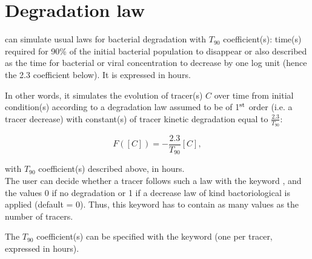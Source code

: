 \chapter{Degradation law}


\waqtel can simulate usual laws for bacterial degradation with
$T_{90}$ coefficient(s):
time(s) required for 90\% of the initial bacterial population to disappear
or also described as the time for bacterial or viral concentration to decrease
by one log unit (hence the 2.3 coefficient below).
It is expressed in hours.

In other words, it simulates the evolution of tracer(s) $C$ over time from
initial condition(s) according to a degradation law assumed to be of
1$^{\rm{st}}$ order (i.e. a tracer decrease) with constant(s) of tracer kinetic
degradation equal to $\frac{2.3}{T_{90}}$:

\begin{equation}
  F([C]) = -\frac{2.3}{T_{90}} [C],
\end{equation}

with $T_{90}$ coefficient(s) described above, in hours.
\\

The user can decide whether a tracer follows such a law
with the keyword ,
and the values 0 if no degradation or 1 if a decrease law
of kind bactoriological is applied (default = 0).
Thus, this keyword has to contain as many values as the number of tracers.

The $T_{90}$ coefficient(s) can be specified
with the keyword 
(one per tracer, expressed in hours).
